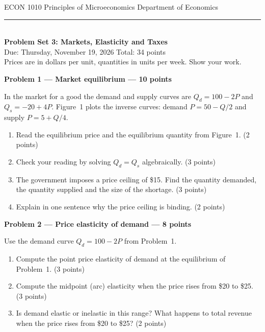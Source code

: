 \documentclass[11pt,a4paper]{article}
\newcommand{\problem}[3]{\bigskip\par\noindent\textbf{Problem #1 --- #2 --- #3 points}\par\nopagebreak\smallskip}
\begin{document}
{\small ECON 1010 \textperiodcentered{} Principles of Microeconomics \hfill Department of Economics}\\[-0.4em]
\rule{\linewidth}{0.6pt}\\[0.5em]
{\Large\bfseries Problem Set 3: Markets, Elasticity and Taxes}\\[0.4em]
Due: Thursday, November 19, 2026 \hfill Total: 34 points\\[0.3em]
{\small Prices are in dollars per unit, quantities in units per week. Show your work.}

\problem{1}{Market equilibrium}{10}
In the market for a good the demand and supply curves are $Q_d = 100 - 2P$ and $Q_s = -20 + 4P$.
Figure~1 plots the inverse curves: demand $P = 50 - Q/2$ and supply $P = 5 + Q/4$.

\begin{center}
\end{center}
\begin{enumerate}
  \item Read the equilibrium price and the equilibrium quantity from Figure~1. (2 points)
  \item Check your reading by solving $Q_d = Q_s$ algebraically. (3 points)
  \item The government imposes a price ceiling of \$15. Find the quantity demanded, the quantity supplied
        and the size of the shortage. (3 points)
  \item Explain in one sentence why the price ceiling is binding. (2 points)
\end{enumerate}

\problem{2}{Price elasticity of demand}{8}
Use the demand curve $Q_d = 100 - 2P$ from Problem~1.
\begin{enumerate}
  \item Compute the point price elasticity of demand at the equilibrium of Problem~1. (3 points)
  \item Compute the midpoint (arc) elasticity when the price rises from \$20 to \$25. (3 points)
  \item Is demand elastic or inelastic in this range? What happens to total revenue when the price rises
        from \$20 to \$25? (2 points)
\end{enumerate}
\end{document}

